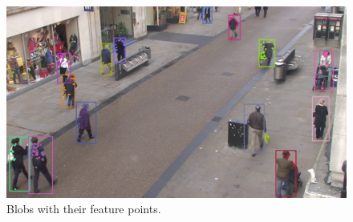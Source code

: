 %


\begin{figure}[H]
\centering         
\includegraphics[width=\textwidth]{intro/pounts.jpg}
\caption{Blobs with their feature points.} \label{solution3}
\end{figure}

 

